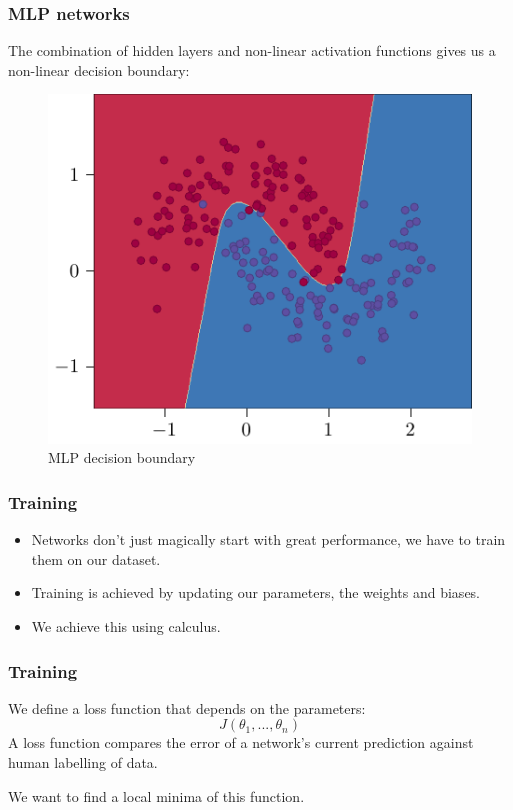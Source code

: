 \documentclass{beamer}
\begin{document}
\begin{frame}
    \frametitle{MLP networks}
    The combination of \alert{hidden layers} and \alert{non-linear activation functions} gives us a \alert{non-linear decision boundary}:
    \begin{figure}
        \centering
        \includegraphics[height=0.6\textheight]{figures/non-linear-boundary/main.pdf}
        \caption{MLP decision boundary}
    \end{figure}
\end{frame}

\begin{frame}
    \frametitle{Training}
    \begin{itemize}
        \item Networks don't just magically start with great performance, we have to \alert{train} them on our dataset. \pause
        \item \alert{Training} is achieved by updating our \alert{parameters}, the weights and biases. \pause
        \item We achieve this using \alert{calculus}.
    \end{itemize}
\end{frame}

\begin{frame}
    \frametitle{Training}
    We define a \alert{loss function} that depends on the parameters:
    \[J(\theta_1,... , \theta_n)\]
    A loss function compares the error of a network's current prediction against human labelling of data. 
    \vspace{0.5cm}

    We want to find a local minima of this function. 
\end{frame}
\end{document}
